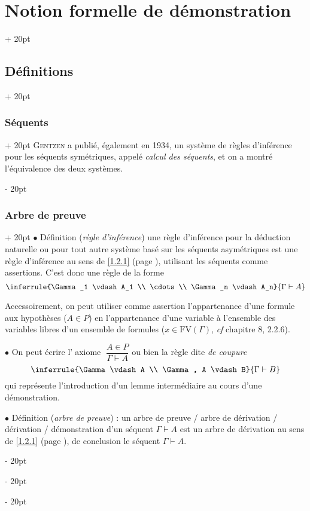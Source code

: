\documentclass[a4paper, 12pt, twoside]{article}
\newcommand{\simplecit}[1]{\guillemotleft$\;$#1$\;$\guillemotright}
\newcommand{\ind}[1][20pt]{\advance\leftskip + #1}
\newcommand{\deind}[1][20pt]{\advance\leftskip - #1}
\newenvironment{indt}[2][20pt]{#2 \par \ind[#1]}{\par \deind} %
\begin{document}
\begin{indt}{\section{Notion formelle de démonstration}}
\begin{indt}{\subsection{Définitions}}
\begin{indt}{\subsubsection{Séquents}}
                \textsc{Gentzen} a publié, également en 1934, un système de règles d'inférence pour les séquents symétriques, appelé \emph{calcul des séquents}, et on a montré l'équivalence des deux systèmes.
            \end{indt}

            \vspace{12pt}
            
            \begin{indt}{\subsubsection{Arbre de preuve}}
                $\bullet$ Définition (\emph{règle d'inférence}) une règle d'inférence pour la déduction naturelle ou pour tout autre système basé sur les séquents asymétriques est une règle d'inférence au sens de \ref{1.2.1} (page \pageref{1.2.1}), utilisant les séquents comme assertions.
                C'est donc une règle de la forme
                \[
                    \inferrule{\Gamma_1 \vdash A_1 \\ \cdots \\ \Gamma_n \vdash A_n}{\Gamma \vdash A}
                \]

                Accessoirement, on peut utiliser comme assertion l'appartenance d'une formule aux hypothèses ($A \in P$) en l'appartenance d'une variable à l'ensemble des variables libres d'un ensemble de formules ($x \in \mathrm{FV}(\Gamma)$, \textit{cf} chapitre 8, 2.2.6).

                \vspace{12pt}
                
                $\bullet$ On peut écrire l'\simplecit{axiome} $\dfrac{A \in P}{\Gamma \vdash A}$ ou bien la règle dite \emph{de coupure}
                \[
                    \inferrule{\Gamma \vdash A \\ \Gamma, A \vdash B}{\Gamma \vdash B}
                \]
                qui représente l'introduction d'un lemme intermédiaire au cours d'une démonstration.

                \vspace{12pt}
                
                $\bullet$ Définition (\emph{arbre de preuve}) : un arbre de preuve / arbre de dérivation / dérivation / démonstration d'un séquent $\Gamma \vdash A$ est un arbre de dérivation au sens de \ref{1.2.1} (page \pageref{1.2.1}), de conclusion le séquent $\Gamma \vdash A$.


\end{indt}
\end{indt}
\end{indt}
\end{document}
